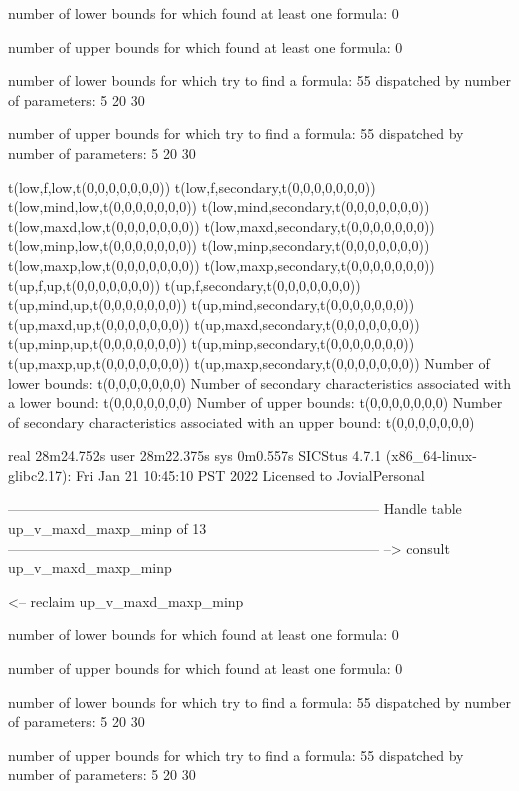 number of lower bounds for which found at least one formula: 0

number of upper bounds for which found at least one formula: 0

number of lower bounds for which try to find a formula: 55
dispatched by number of parameters: 5  20  30

number of upper bounds for which try to find a formula: 55
dispatched by number of parameters: 5  20  30

t(low,f,low,t(0,0,0,0,0,0,0))
t(low,f,secondary,t(0,0,0,0,0,0,0))
t(low,mind,low,t(0,0,0,0,0,0,0))
t(low,mind,secondary,t(0,0,0,0,0,0,0))
t(low,maxd,low,t(0,0,0,0,0,0,0))
t(low,maxd,secondary,t(0,0,0,0,0,0,0))
t(low,minp,low,t(0,0,0,0,0,0,0))
t(low,minp,secondary,t(0,0,0,0,0,0,0))
t(low,maxp,low,t(0,0,0,0,0,0,0))
t(low,maxp,secondary,t(0,0,0,0,0,0,0))
t(up,f,up,t(0,0,0,0,0,0,0))
t(up,f,secondary,t(0,0,0,0,0,0,0))
t(up,mind,up,t(0,0,0,0,0,0,0))
t(up,mind,secondary,t(0,0,0,0,0,0,0))
t(up,maxd,up,t(0,0,0,0,0,0,0))
t(up,maxd,secondary,t(0,0,0,0,0,0,0))
t(up,minp,up,t(0,0,0,0,0,0,0))
t(up,minp,secondary,t(0,0,0,0,0,0,0))
t(up,maxp,up,t(0,0,0,0,0,0,0))
t(up,maxp,secondary,t(0,0,0,0,0,0,0))
Number of lower bounds:                                             t(0,0,0,0,0,0,0)
Number of secondary characteristics associated with a lower bound:  t(0,0,0,0,0,0,0)
Number of upper bounds:                                             t(0,0,0,0,0,0,0)
Number of secondary characteristics associated with an upper bound: t(0,0,0,0,0,0,0)

real	28m24.752s
user	28m22.375s
sys	0m0.557s
SICStus 4.7.1 (x86_64-linux-glibc2.17): Fri Jan 21 10:45:10 PST 2022
Licensed to JovialPersonal


--------------------------------------------------------------------------------
Handle table up_v_maxd_maxp_minp of 13
--------------------------------------------------------------------------------
--> consult up_v_maxd_maxp_minp

<-- reclaim up_v_maxd_maxp_minp

number of lower bounds for which found at least one formula: 0

number of upper bounds for which found at least one formula: 0

number of lower bounds for which try to find a formula: 55
dispatched by number of parameters: 5  20  30

number of upper bounds for which try to find a formula: 55
dispatched by number of parameters: 5  20  30

